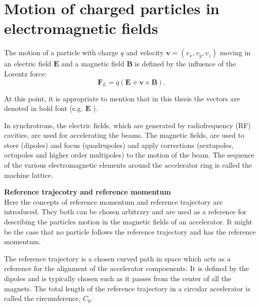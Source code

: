 \section{Motion of charged particles in electromagnetic fields}
The motion of a particle with charge $q$ and velocity $\mathbf{v}=(v_x, v_y, v_z)$ moving in an electric field $\mathbf{E}$ and a magnetic field $\mathbf{B}$ is defined by the influence of the Lorentz force: 
\begin{equation}\label{eq:Lorentz_force}
 \mathbf{F}_L = q(\mathbf{E} + \mathbf{v} \times \mathbf{B}).
\end{equation}

At this point, it is appropriate to mention that in this thesis the vectors are denoted in bold font (e.g. $\mathbf{E}$ ). %

In synchrotrons, the electric fields, which are generated by radiofrequency (RF) cavities, are used for accelerating the beams. The magnetic fields, are used to steer (dipoles) and focus (quadrupoles) and apply corrections (sextupoles, octupoles and higher order multipoles) to the motion of the beam. The sequence of the various electromagnetic elements around the accelerator ring is called the machine lattice. 

\textbf{Reference trajecotry and reference momentum}\\
Here the concepts of reference momentum and reference trajectory are introduced. They both can be chosen arbitrary and are used as a reference for describing the particles motion in the magnetic fields of an accelerator. It might be the case that no particle follows the reference trajectory and has the reference momentum.

The reference trajectory is a chosen curved path in space which acts as a reference for the alignment of the accelerator compoenents. It is defined by the dipoles and is typically chosen such as it passes from the center of all the magnets. %
The total length of the reference trajectory in a circular accelerator is called the circumference, $C_0$.



